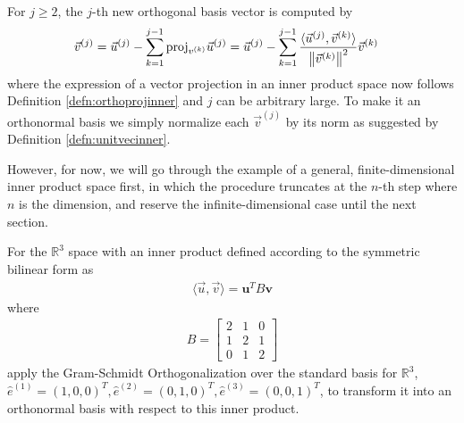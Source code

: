\begin{defn}
\begin{align}
\end{align}
For $j \geq 2$, the $j$-th new orthogonal basis vector is computed by
\begin{align}
\vec{v}^{(j)} &= \vec{u}^{(j)} - \sum_{k=1}^{j-1}\text{proj}_{v^{(k)}}\vec{u}^{(j)}  = \vec{u}^{(j)} - \sum_{k=1}^{j-1}\frac{\langle \vec{u}^{(j)}, \vec{v}^{(k)} \rangle}{\norm{\vec{v}^{(k)}}^2} \vec{v}^{(k)}
\end{align}
where the expression of a vector projection in an inner product space now follows Definition \ref{defn:orthoprojinner} and $j$ can be arbitrary large. To make it an orthonormal basis we simply normalize each $\vec{v}^{(j)}$ by its norm as suggested by Definition \ref{defn:unitvecinner}.  
\end{defn}
However, for now, we will go through the example of a general, finite-dimensional inner product space first, in which the procedure truncates at the $n$-th step where $n$ is the dimension, and reserve the infinite-dimensional case until the next section.
\begin{exmp}
\label{exmp:R3innerGS}
For the $\mathbb{R}^3$ space with an inner product defined according to the symmetric bilinear form as
\begin{align*}
\langle \vec{u}, \vec{v} \rangle = \textbf{u}^TB\textbf{v}
\end{align*}
where 
\begin{align*}
B =
\begin{bmatrix}
2&1&0\\ 
1&2&1\\
0&1&2
\end{bmatrix}
\end{align*}
apply the Gram-Schmidt Orthogonalization over the standard basis for $\mathbb{R}^3$, $\hat{e}^{(1)} = (1,0,0)^T, \hat{e}^{(2)} = (0,1,0)^T, \hat{e}^{(3)} = (0,0,1)^T$, to transform it into an orthonormal basis with respect to this inner product.
\end{exmp}
